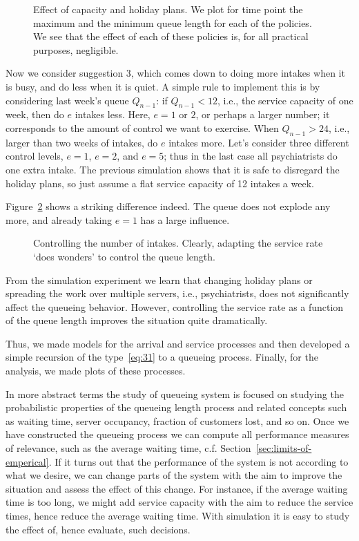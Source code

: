\begin{figure}[ht]
  \centering
 
\caption{Effect of capacity and holiday plans. We plot for time point
  the maximum and the minimum queue length for each of the
  policies. We see that the effect of each of these policies is, for
  all practical purposes, negligible.  }
\label{fig:balanced}
\end{figure}


Now we consider suggestion 3, which comes down to doing more intakes
when it is busy, and do less when it is quiet. A simple rule to
implement this is by considering last week's queue $Q_{n-1}$: if
$Q_{n-1}<12$, i.e., the service capacity of one week, then do $e$
intakes less. Here, $e=1$ or $2$, or perhaps a larger number; it
corresponds to the amount of control we want to exercise. When
$Q_{n-1}>24$, i.e., larger than two weeks of intakes, do $e$ intakes
more. Let's consider three different control levels, $e=1$, $e=2$, and
$e=5$; thus in the last case all psychiatrists do one extra intake.
The previous simulation shows that it is safe to disregard the holiday
plans, so just assume a flat service capacity of 12 intakes a week.

Figure~\ref{fig:intakes} shows a striking difference indeed. The queue
does not explode any more, and already taking $e=1$ has a large
influence. 

\begin{figure}[ht]
  \centering
  
\caption{Controlling the number of intakes. Clearly, adapting the
  service rate `does wonders' to control the queue length.}
\label{fig:intakes}
\end{figure}

From the simulation experiment we learn that changing holiday plans or
spreading the work over multiple servers, i.e., psychiatrists, does
not significantly affect the queueing behavior.  However, controlling
the service rate as a function of the queue length improves the
situation quite dramatically. 

Thus, we made models for the arrival and service processes and then
developed a simple recursion of the type~\eqref{eq:31} to
 a queueing process. Finally, for the analysis, we
made plots of these processes. 


In more abstract terms the study of queueing system is focused on
studying the probabilistic properties of the queueing length process
and related concepts such as waiting time, server occupancy, fraction
of customers lost, and so on. Once we have constructed the queueing
process we can compute all performance measures of relevance, such as
the average waiting time,
c.f. Section~\ref{sec:limits-of-emperical}. If it turns out that the
performance of the system is not according to what we desire, we can
change parts of the system with the aim to improve the situation and
assess the effect of this change.  For instance, if the average
waiting time is too long, we might add service capacity with the aim
to reduce the service times, hence reduce the average waiting
time. With simulation it is easy to study the effect of, hence
evaluate, such decisions.

